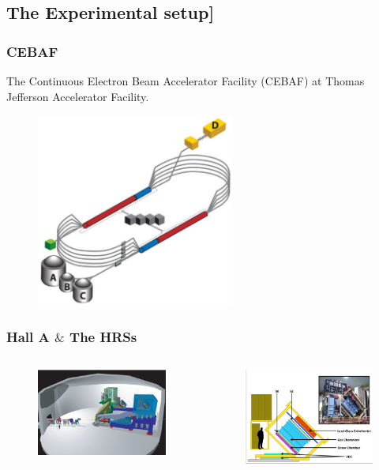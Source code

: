 \documentclass{beamer}
\begin{document}
\subsection[Experiment]{The Experimental setup]}
\begin{frame}
\frametitle{CEBAF}

The Continuous Electron Beam Accelerator Facility (CEBAF) at Thomas Jefferson Accelerator Facility.
\vspace{-20pt}
\begin{figure}
	\includegraphics[width=6.5cm]{../images/cebaf.pdf}
\end{figure}

\end{frame}
\begin{frame}
\frametitle{Hall A $\&$ The HRSs}


\vspace{-20pt}
\begin{columns}
\begin{figure}
	\includegraphics[width=6cm]{../images/halla.pdf}
\end{figure}
\begin{figure}
	\includegraphics[width=6cm]{../images/HRS_cartoon}
\end{figure}

\end{columns}
\end{frame}
\end{document}
